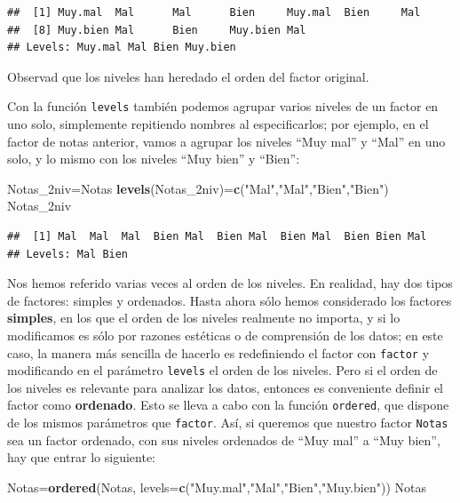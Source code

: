 \documentclass[]{book}
\newenvironment{Shaded}{\begin{snugshade}}{\end{snugshade}}
\newcommand{\DataTypeTok}[1]{\textcolor[rgb]{0.13,0.29,0.53}{#1}}
\newcommand{\KeywordTok}[1]{\textcolor[rgb]{0.13,0.29,0.53}{\textbf{#1}}}
\newcommand{\NormalTok}[1]{#1}
\newcommand{\StringTok}[1]{\textcolor[rgb]{0.31,0.60,0.02}{#1}}
\theoremstyle{definition}
\theoremstyle{definition}
\theoremstyle{definition}
\theoremstyle{remark}
\begin{document}
\begin{verbatim}
##  [1] Muy.mal  Mal      Mal      Bien     Muy.mal  Bien     Mal     
##  [8] Muy.bien Mal      Bien     Muy.bien Mal     
## Levels: Muy.mal Mal Bien Muy.bien
\end{verbatim}

Observad que los niveles han heredado el orden del factor original.

Con la función \texttt{levels} también podemos agrupar varios niveles de un factor en uno solo, simplemente repitiendo nombres al especificarlos; por ejemplo, en el factor de notas anterior, vamos a agrupar los niveles ``Muy mal'' y ``Mal'' en uno solo, y lo mismo con los niveles ``Muy bien'' y ``Bien'':

\begin{Shaded}
\begin{Highlighting}[]
\NormalTok{Notas_2niv=Notas}
\KeywordTok{levels}\NormalTok{(Notas_2niv)=}\KeywordTok{c}\NormalTok{(}\StringTok{"Mal"}\NormalTok{,}\StringTok{"Mal"}\NormalTok{,}\StringTok{"Bien"}\NormalTok{,}\StringTok{"Bien"}\NormalTok{)}
\NormalTok{Notas_2niv}
\end{Highlighting}
\end{Shaded}

\begin{verbatim}
##  [1] Mal  Mal  Mal  Bien Mal  Bien Mal  Bien Mal  Bien Bien Mal 
## Levels: Mal Bien
\end{verbatim}

Nos hemos referido varias veces al orden de los niveles. En realidad, hay dos tipos de factores: simples y ordenados. Hasta ahora sólo hemos considerado los factores \textbf{simples}, en los que el orden de los niveles realmente no importa, y si lo modificamos es sólo por razones estéticas o de comprensión de los datos; en este caso, la manera más sencilla de hacerlo es redefiniendo el factor con \texttt{factor} y modificando en el parámetro \texttt{levels} el orden de los niveles.
Pero si el orden de los niveles es relevante para analizar los datos, entonces es conveniente definir el factor como \textbf{ordenado}. Esto se lleva a cabo con la función \texttt{ordered}, que dispone de los mismos parámetros que \texttt{factor}. Así, si queremos que nuestro factor \texttt{Notas} sea un factor ordenado, con sus niveles ordenados de ``Muy mal'' a ``Muy bien'', hay que entrar lo siguiente:

\begin{Shaded}
\begin{Highlighting}[]
\NormalTok{Notas=}\KeywordTok{ordered}\NormalTok{(Notas, }\DataTypeTok{levels=}\KeywordTok{c}\NormalTok{(}\StringTok{"Muy.mal"}\NormalTok{,}\StringTok{"Mal"}\NormalTok{,}\StringTok{"Bien"}\NormalTok{,}\StringTok{"Muy.bien"}\NormalTok{))}
\NormalTok{Notas}
\end{Highlighting}
\end{Shaded}
\end{document}
